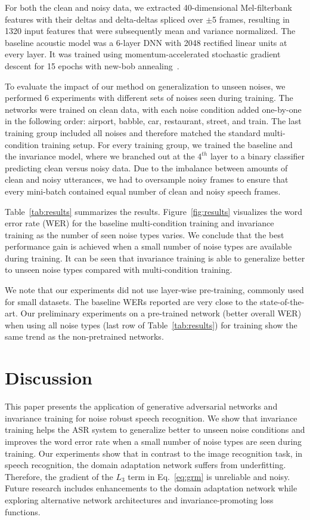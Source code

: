 \documentclass[a4paper]{article}
\begin{document}
For both the clean and noisy data, we extracted 40-dimensional Mel-filterbank features with their deltas and 
delta-deltas spliced over $\pm$5 frames, resulting in 1320 input 
features that were subsequently mean and variance normalized. The baseline
acoustic model was a 6-layer 
DNN with 2048 rectified linear units at every layer. It was trained using 
momentum-accelerated stochastic gradient descent for 15 epochs with new-bob 
annealing~\citep[half the learning rate if no improvement on the validation set, as in][]{morgan1995continuous,sainath2011making}.

To evaluate the impact of our method on generalization to unseen noises,
we performed 6 experiments with different sets of noises seen during training.
The networks were trained
on clean data, with each noise condition added one-by-one in the following order: airport, babble, car, 
restaurant, street, and train. The last training group included all noises and therefore matched the
standard multi-condition training setup. For every training group, we trained the
baseline and the invariance model, where we branched out at the $4^{th}$ layer to a
binary classifier predicting clean versus noisy data. Due to the imbalance between amounts of clean and
noisy utterances, we had to oversample noisy frames to ensure that every mini-batch contained
equal number of clean and noisy speech frames.

Table~\ref{tab:results} summarizes the results. Figure~\ref{fig:results} visualizes 
the word error rate (WER) for the baseline multi-condition training and invariance training 
as the number of seen noise types varies. We conclude that the best performance
gain is achieved when a small number of noise types are available during training. 
It can be seen that invariance training is able to generalize better to unseen 
noise types compared with multi-condition training.

We note that our experiments did not use layer-wise pre-training, commonly used for small
datasets. The baseline WERs reported are very close to the state-of-the-art. 
Our preliminary experiments on a pre-trained network (better overall WER) when 
using all noise types (last row of Table~\ref{tab:results}) for training show 
the same trend as the non-pretrained networks.

\section{Discussion}
\label{sec:discussion}
    This paper presents the application of generative adversarial networks and 
    invariance training for noise robust speech recognition. We show that invariance training 
    helps the ASR system to generalize better to unseen noise conditions and improves 
    the word error rate when a small number of noise types are seen during training. Our 
    experiments show that in contrast to the image recognition task, in speech 
    recognition, the domain adaptation network suffers from underfitting. Therefore, the 
    gradient of the $L_3$ term in Eq.~\ref{eq:grm} is unreliable and noisy. Future 
    research includes enhancements to the domain adaptation network while exploring 
    alternative network architectures and invariance-promoting loss functions.
\end{document}
